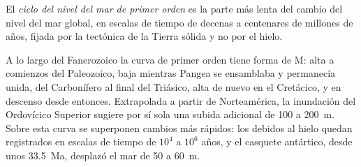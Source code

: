 \begin{definition}\label{def:b2:phanerozoic-earth:first-order}
El \emph{ciclo del nivel del mar de primer orden} es la parte más lenta
del cambio del nivel del mar global, en escalas de tiempo de decenas a centenares de millones de años, fijada por
la tectónica de la Tierra sólida y no por el hielo.
\end{definition}

A lo largo del Fanerozoico la curva de primer orden tiene forma de M: alta a comienzos del Paleozoico,
baja mientras Pangea se ensamblaba y permanecía unida, del Carbonífero al final del Triásico, alta
de nuevo en el Cretácico, y en descenso desde entonces. Extrapolada a partir de Norteamérica, la inundación del Ordovícico
Superior sugiere por sí sola una subida adicional de 100 a \qty{200}{m}.
Sobre esta curva se superponen cambios más rápidos: los debidos al hielo quedan registrados en escalas de tiempo de $10^4$ a
$10^6$ años, y el casquete antártico, desde unos \qty{33.5}{Ma}, desplazó el mar de 50 a
\qty{60}{m}.

